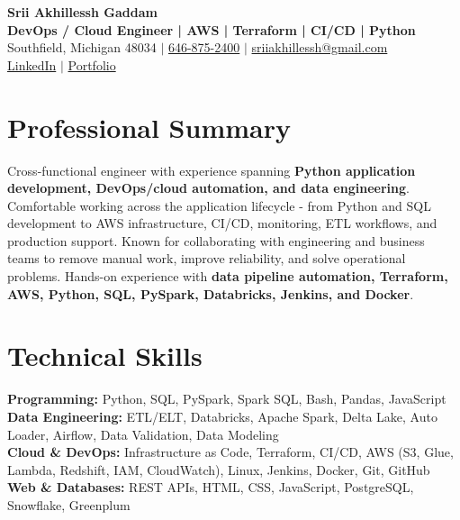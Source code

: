 \documentclass[letterpaper,10pt]{article}
\begin{document}
\fontsize{9.35pt}{10.45pt}\selectfont

\begin{center}
    {\LARGE \textbf{Srii Akhillessh Gaddam}} \\[-1pt]
    \textbf{DevOps / Cloud Engineer | AWS | Terraform | CI/CD | Python} \\[2pt]
    Southfield, Michigan 48034 $|$
    \href{tel:6468752400}{646-875-2400} $|$
    \href{mailto:sriiakhillessh@gmail.com}{sriiakhillessh@gmail.com} \\[1pt]
    \href{https://www.linkedin.com/in/srii-akhiilessh-gaddam-b48668191/}{LinkedIn} $|$
    \href{https://sriiakhillesshg.github.io/portfolio/}{Portfolio}
\end{center}
\vspace{-8pt}

\section{Professional Summary}
\small{Cross-functional engineer with experience spanning \textbf{Python application development, DevOps/cloud automation, and data engineering}. Comfortable working across the application lifecycle - from Python and SQL development to AWS infrastructure, CI/CD, monitoring, ETL workflows, and production support. Known for collaborating with engineering and business teams to remove manual work, improve reliability, and solve operational problems. Hands-on experience with \textbf{data pipeline automation, Terraform, AWS, Python, SQL, PySpark, Databricks, Jenkins, and Docker}.}

\section{Technical Skills}
\small{
\textbf{Programming:} Python, SQL, PySpark, Spark SQL, Bash, Pandas, JavaScript \\
\textbf{Data Engineering:} ETL/ELT, Databricks, Apache Spark, Delta Lake, Auto Loader, Airflow, Data Validation, Data Modeling \\
\textbf{Cloud \& DevOps:} Infrastructure as Code, Terraform, CI/CD, AWS (S3, Glue, Lambda, Redshift, IAM, CloudWatch), Linux, Jenkins, Docker, Git, GitHub \\
\textbf{Web \& Databases:} REST APIs, HTML, CSS, JavaScript, PostgreSQL, Snowflake, Greenplum
}
\end{document}
